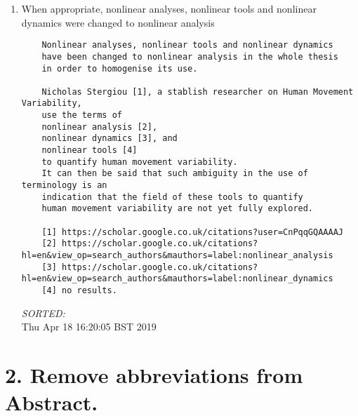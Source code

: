 \documentclass[12pt]{article}
\begin{document}
\begin{enumerate}
\item  	When appropriate, nonlinear analyses, nonlinear tools and 
	nonlinear dynamics were changed to nonlinear analysis
	\begin{verbatim}
	Nonlinear analyses, nonlinear tools and nonlinear dynamics 
	have been changed to nonlinear analysis in the whole thesis 
	in order to homogenise its use.

	Nicholas Stergiou [1], a stablish researcher on Human Movement Variability,
	use the terms of 
	nonlinear analysis [2], 
	nonlinear dynamics [3], and 
	nonlinear tools [4]
	to quantify human movement variability.
	It can then be said that such ambiguity in the use of terminology is an 
	indication that the field of these tools to quantify 
	human movement variability are not yet fully explored.

	[1] https://scholar.google.co.uk/citations?user=CnPqqGQAAAAJ
	[2] https://scholar.google.co.uk/citations?hl=en&view_op=search_authors&mauthors=label:nonlinear_analysis
	[3] https://scholar.google.co.uk/citations?hl=en&view_op=search_authors&mauthors=label:nonlinear_dynamics
	[4] no results.

	\end{verbatim}
	\textit{
	SORTED:  
	}
	\\



Thu Apr 18 16:20:05 BST 2019

\end{enumerate}


\section*{2. Remove abbreviations from Abstract.}
\end{document}
